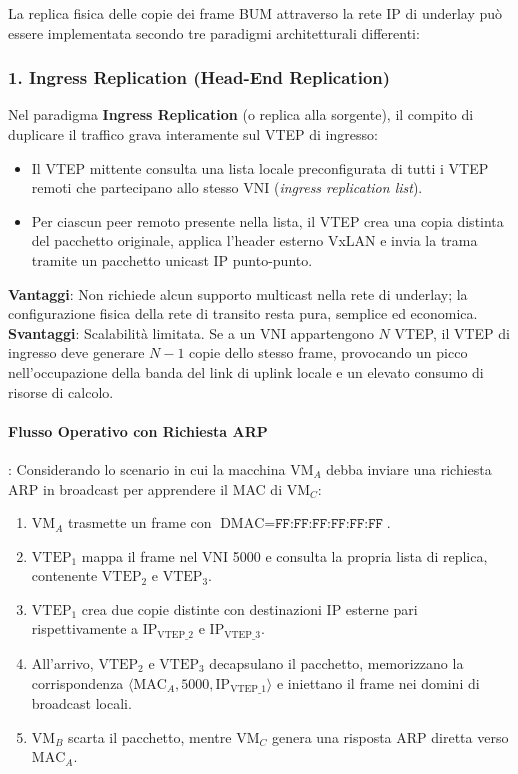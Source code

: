 \documentclass[11pt, a4paper]{article}
\begin{document}
La replica fisica delle copie dei frame BUM attraverso la rete IP di underlay può essere implementata secondo tre paradigmi architetturali differenti:

\subsubsection{1. Ingress Replication (Head-End Replication)}
Nel paradigma \textbf{Ingress Replication} (o replica alla sorgente), il compito di duplicare il traffico grava interamente sul VTEP di ingresso:
\begin{itemize}
    \item Il VTEP mittente consulta una lista locale preconfigurata di tutti i VTEP remoti che partecipano allo stesso VNI (\emph{ingress replication list}).
    \item Per ciascun peer remoto presente nella lista, il VTEP crea una copia distinta del pacchetto originale, applica l'header esterno VxLAN e invia la trama tramite un pacchetto unicast IP punto-punto.
\end{itemize}
\textbf{Vantaggi}: Non richiede alcun supporto multicast nella rete di underlay; la configurazione fisica della rete di transito resta pura, semplice ed economica. \\
\textbf{Svantaggi}: Scalabilità limitata. Se a un VNI appartengono $N$ VTEP, il VTEP di ingresso deve generare $N-1$ copie dello stesso frame, provocando un picco nell'occupazione della banda del link di uplink locale e un elevato consumo di risorse di calcolo.


\paragraph{Flusso Operativo con Richiesta ARP}:
Considerando lo scenario in cui la macchina $\text{VM}_A$ debba inviare una richiesta ARP in broadcast per apprendere il MAC di $\text{VM}_C$:
\begin{enumerate}[noitemsep]
    \item $\text{VM}_A$ trasmette un frame con $\text{DMAC} = \texttt{FF:FF:FF:FF:FF:FF}$.
    \item $\text{VTEP}_1$ mappa il frame nel VNI 5000 e consulta la propria lista di replica, contenente $\text{VTEP}_2$ e $\text{VTEP}_3$.
    \item $\text{VTEP}_1$ crea due copie distinte con destinazioni IP esterne pari rispettivamente a $\text{IP}_{\text{VTEP\_2}}$ e $\text{IP}_{\text{VTEP\_3}}$.
    \item All'arrivo, $\text{VTEP}_2$ e $\text{VTEP}_3$ decapsulano il pacchetto, memorizzano la corrispondenza $\langle \text{MAC}_A, 5000, \text{IP}_{\text{VTEP\_1}} \rangle$ e iniettano il frame nei domini di broadcast locali.
    \item $\text{VM}_B$ scarta il pacchetto, mentre $\text{VM}_C$ genera una risposta ARP diretta verso $\text{MAC}_A$.
\end{enumerate}
\end{document}
